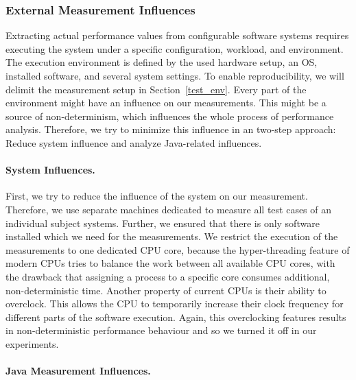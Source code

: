 \subsubsection{External Measurement Influences}

Extracting actual performance values from configurable software systems requires executing the system under a specific configuration, workload, and environment. The execution environment is defined by the used hardware setup, an \ac{OS}, installed software, and several system settings. To enable reproducibility, we will delimit the measurement setup in Section~\ref{test_env}. Every part of the environment might have an influence on our measurements. This might be a source of non-determinism, which influences the whole process of performance analysis. Therefore, we try to minimize this influence in an two-step approach: Reduce system influence and analyze Java-related influences.

\paragraph{System Influences.}
\label{perf_measure_system}

First, we try to reduce the influence of the system on our measurement. Therefore, we use separate machines dedicated to measure all test cases of an individual subject systems. Further, we ensured that there is only software installed which we need for the measurements. We restrict the execution of the measurements to one dedicated CPU core, because the hyper-threading feature of modern CPUs tries to balance the work between all available CPU cores, with the drawback that assigning a process to a specific core consumes additional, non-deterministic time. Another property of current CPUs is their ability to overclock. This allows the CPU to temporarily increase their clock frequency for different parts of the software execution. Again, this overclocking features results in non-deterministic performance behaviour and so we turned it off in our experiments.


\paragraph{Java Measurement Influences.}
\label{perf_measure_java}

